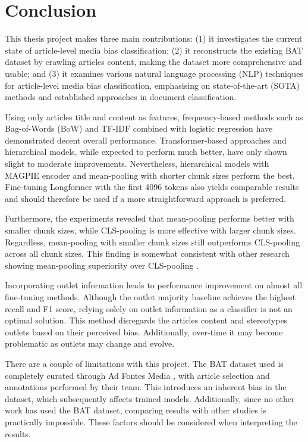 \chapter{Conclusion}
\label{cha:6}

This thesis project makes three main contributions: (1) it investigates the current state of article-level media bias classification; (2) it reconstructs the existing BAT dataset by crawling articles content, making the dataset more comprehensive and usable; and (3) it examines various natural language processing (NLP) techniques for article-level media bias classification, emphasising on state-of-the-art (SOTA) methods and established approaches in document classification.

Using only articles title and content as features, frequency-based methods such as Bag-of-Words (BoW) and TF-IDF combined with logistic regression have demonstrated decent overall performance. Transformer-based approaches and hierarchical models, while expected to perform much better, have only shown slight to moderate improvements. Nevertheless, hierarchical models with MAGPIE encoder and mean-pooling with shorter chunk sizes perform the best. Fine-tuning Longformer with the first 4096 tokens also yields comparable results and should therefore be used if a more straightforward approach is preferred.

Furthermore, the experiments revealed that mean-pooling performs better with smaller chunk sizes, while CLS-pooling is more effective with larger chunk sizes. Regardless, mean-pooling with smaller chunk sizes still outperforms CLS-pooling across all chunk sizes. This finding is somewhat consistent with other research showing mean-pooling superiority over CLS-pooling \cite{rodrigo-2024-systematic-review-media-bias}.

Incorporating outlet information leads to performance improvement on almost all fine-tuning methods. Although the outlet majority baseline achieves the highest recall and F1 score, relying solely on outlet information as a classifier is not an optimal solution. This method disregards the articles content and stereotypes outlets based on their perceived bias. Additionally, over-time it may become problematic as outlets may change and evolve.

There are a couple of limitations with this project. The BAT dataset used is completely curated through Ad Fontes Media \cite{adfontes}, with article selection and annotations performed by their team. This introduces an inherent bias in the dataset, which subsequently affects trained models. Additionally, since no other work has used the BAT dataset, comparing results with other studies is practically impossible. These factors should be considered when interpreting the results.

